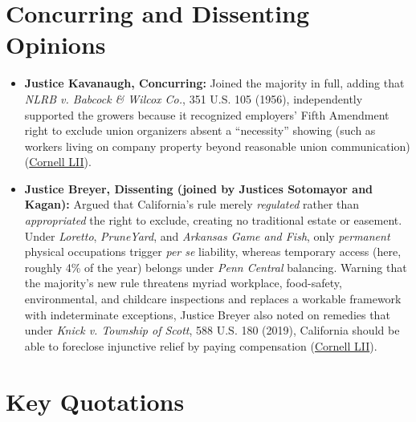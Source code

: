 \documentclass[12pt]{article}
\begin{document}
\section{Concurring and Dissenting Opinions}

\begin{itemize}
    \item \textbf{Justice Kavanaugh, Concurring:} Joined the majority in full, adding that \textit{NLRB v. Babcock \& Wilcox Co.}, 351 U.S. 105 (1956), independently supported the growers because it recognized employers' Fifth Amendment right to exclude union organizers absent a ``necessity'' showing (such as workers living on company property beyond reasonable union communication) (\href{https://www.law.cornell.edu/supremecourt/text/20-107}{Cornell LII}).
    \item \textbf{Justice Breyer, Dissenting (joined by Justices Sotomayor and Kagan):} Argued that California's rule merely \emph{regulated} rather than \emph{appropriated} the right to exclude, creating no traditional estate or easement. Under \textit{Loretto}, \textit{PruneYard}, and \textit{Arkansas Game and Fish}, only \emph{permanent} physical occupations trigger \emph{per se} liability, whereas temporary access (here, roughly 4\% of the year) belongs under \textit{Penn Central} balancing. Warning that the majority's new rule threatens myriad workplace, food-safety, environmental, and childcare inspections and replaces a workable framework with indeterminate exceptions, Justice Breyer also noted on remedies that under \textit{Knick v. Township of Scott}, 588 U.S. 180 (2019), California should be able to foreclose injunctive relief by paying compensation (\href{https://www.law.cornell.edu/supremecourt/text/20-107}{Cornell LII}).
\end{itemize}

\section{Key Quotations}
\end{document}
